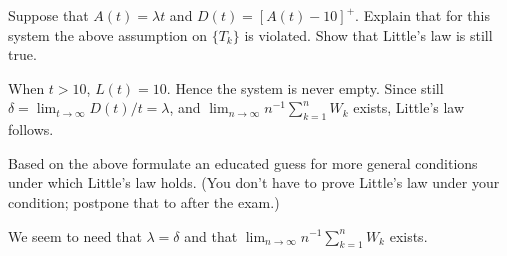 \begin{exercise}
 Suppose that $A(t) = \lambda t$ and $D(t)= [A(t) - 10]^+$.
 Explain that for this system the above assumption on $\{T_k\}$ is violated. Show that Little's law is still true.
\begin{solution}
 When $t>10$, $L(t) = 10$.
 Hence the system is never empty.
 Since still $\delta=\lim_{t\to\infty} D(t)/t = \lambda$, and $\lim_{n\to \infty} n^{-1}\sum_{k=1}^n W_k$ exists, Little's law follows.
\end{solution}
\end{exercise}

\begin{exercise}
 Based on the above formulate an educated guess for more general conditions under which Little's law holds.
 (You don't have to prove Little's law under your condition; postpone that to after the exam.)
\begin{solution}
We seem to need that $\lambda = \delta$ and that $\lim_{n\to \infty} n^{-1}\sum_{k=1}^n W_k$ exists. 
\end{solution}
\end{exercise}








